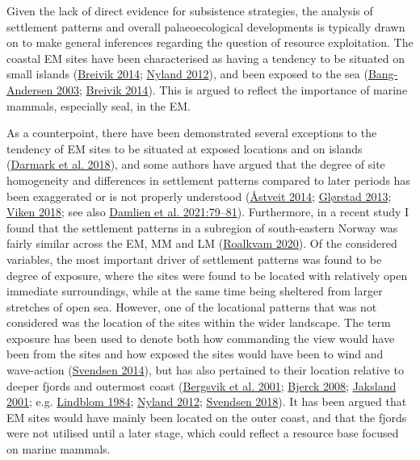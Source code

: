 \documentclass[
  a4paper,
  oneside]{uiophdthesis}
\begin{document}
Given the lack of direct evidence for subsistence strategies, the analysis of settlement patterns and overall palaeoecological developments is typically drawn on to make general inferences regarding the question of resource exploitation. The coastal EM sites have been characterised as having a tendency to be situated on small islands (\protect\hyperlink{ref-breivik2014}{Breivik 2014}; \protect\hyperlink{ref-nyland2012}{Nyland 2012}), and been exposed to the sea (\protect\hyperlink{ref-bang-andersen2003}{Bang-Andersen 2003}; \protect\hyperlink{ref-breivik2014}{Breivik 2014}). This is argued to reflect the importance of marine mammals, especially seal, in the EM.

As a counterpoint, there have been demonstrated several exceptions to the tendency of EM sites to be situated at exposed locations and on islands (\protect\hyperlink{ref-darmark2018}{Darmark et al. 2018}), and some authors have argued that the degree of site homogeneity and differences in settlement patterns compared to later periods has been exaggerated or is not properly understood (\protect\hyperlink{ref-uxe5stveit2014}{Åstveit 2014}; \protect\hyperlink{ref-glorstad2013}{Glørstad 2013}; \protect\hyperlink{ref-viken2018}{Viken 2018}; see also \protect\hyperlink{ref-damlien2021}{Damlien et al. 2021:79--81}). Furthermore, in a recent study I found that the settlement patterns in a subregion of south-eastern Norway was fairly similar across the EM, MM and LM (\protect\hyperlink{ref-roalkvam2020}{Roalkvam 2020}). Of the considered variables, the most important driver of settlement patterns was found to be degree of exposure, where the sites were found to be located with relatively open immediate surroundings, while at the same time being sheltered from larger stretches of open sea. However, one of the locational patterns that was not considered was the location of the sites within the wider landscape. The term exposure has been used to denote both how commanding the view would have been from the sites and how exposed the sites would have been to wind and wave-action (\protect\hyperlink{ref-svendsen2014}{Svendsen 2014}), but has also pertained to their location relative to deeper fjords and outermost coast (\protect\hyperlink{ref-bergsvik2001}{Bergsvik et al. 2001}; \protect\hyperlink{ref-bjerck2008}{Bjerck 2008}; \protect\hyperlink{ref-jaksland2001}{Jaksland 2001}; e.g. \protect\hyperlink{ref-lindblom1984}{Lindblom 1984}; \protect\hyperlink{ref-nyland2012}{Nyland 2012}; \protect\hyperlink{ref-svendsen2018}{Svendsen 2018}). It has been argued that EM sites would have mainly been located on the outer coast, and that the fjords were not utilised until a later stage, which could reflect a resource base focused on marine mammals.
\end{document}
